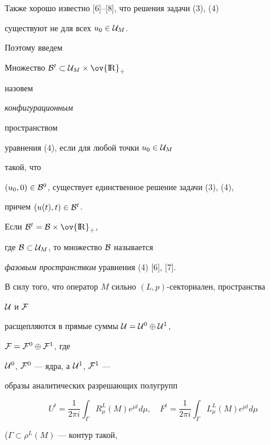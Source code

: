 Также хорошо известно [6]--[8], что решения задачи (3), (4)


существуют не для всех $u_0 \in {\cal{U}}_M$.


Поэтому введем





\begin{defn}


Множество ${\cal{B}}^t\subset{\cal U}_M\times{\ov {\R}}_+$


назовем {\it конфигурационным


пространством} уравнения (4), если для любой точки $u_0 \in {\cal U}_M$


такой, что


$(u_0,0)\in {\cal {B}}^0$, существует единственное решение задачи (3), (4),


причем $(u(t),t) \in{\cal{B}}^t$.


\end{defn}





\begin{note}


Если ${\cal{B}}^t={\cal{B}} \times {\ov {\R}}_+$,


где ${\cal{B}}\subset {\cal{U}}_M$, то множество $\cal{B}$ называется


{\it фазовым пространством} уравнения (4) [6], [7].


\end{note}





В силу того, что оператор $M$ сильно $(L,p)$-секториален, пространства


${\cal U}$ и ${\cal F}$


расщепляются в прямые суммы ${\cal U}={\cal U}^0 \oplus {\cal U}^1$,


${\cal F}={\cal F}^0 \oplus {\cal F}^1$, где


${\cal U}^0$, ${\cal F}^0$ --- ядра, а ${\cal U}^1$, ${\cal F}^1$ ---


образы аналитических разрешающих полугрупп


$$


U^t=\frac{1}{2\pi i}\int_{\Gamma} R^{L}_{\mu}(M)e^{\mu t}d\mu,\quad


F^t=\frac{1}{2\pi i}\int_{\Gamma} L^{L}_{\mu}(M)e^{\mu t}d\mu


$$


($\Gamma \subset {\rho}^L (M)$ --- контур такой,


